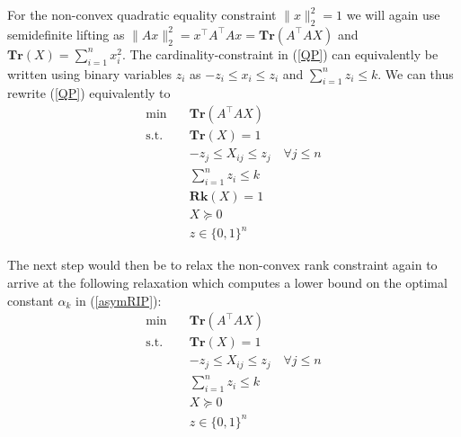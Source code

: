 \documentclass[a4paper,11pt,1p]{elsarticle}
\newcommand{\Norm}[2]{\lVert{#1}\rVert_{#2}}
\newcommand{\T}{^{\top}}
\newcommand{\Tr}{\textbf{Tr}}
\newcommand{\Rk}{\textbf{Rk}}
\begin{document}
For the non-convex quadratic equality constraint $\Norm{x}{2}^2 = 1$ we will
again use semidefinite lifting as $\Norm{Ax}{2}^2 = x\T A\T Ax =
\Tr(A\T A X)$ and $\Tr(X) = \sum_{i=1}^n x_i^2$. 
The cardinality-constraint in (\ref{QP}) can equivalently be written using binary variables $z_i$ as $-z_i \leq x_i \leq z_i$ and $\sum_{i=1}^n z_i \leq k$. We can thus rewrite (\ref{QP}) equivalently to
% 
% 
\begin{align}\label{Rk1MISDP}
 \min \quad & \Tr(A\T A X) \nonumber \\
 \text{s.t.} \quad & \Tr(X) = 1 \nonumber \\
 & -z_j \leq X_{ij} \leq z_j \quad \forall j \leq n \nonumber \\
 & \sum_{i=1}^n z_i \leq k \tag{Rk1MISDP} \\
 & \Rk(X) = 1 \nonumber \\
 & X \succeq 0  \nonumber \\
 & z \in \{0,1\}^n \nonumber
\end{align}

The next step would then be to relax the non-convex rank constraint again to arrive at the following relaxation which computes a lower bound on the optimal constant $\alpha_k$ in (\ref{asymRIP}):
\begin{align}\label{MISDP}
 \min \quad & \Tr(A\T A X) \nonumber \\
 \text{s.t.} \quad & \Tr(X) = 1 \nonumber \\
 & -z_j \leq X_{ij} \leq z_j \quad \forall j \leq n \nonumber \\
 & \sum_{i=1}^n z_i \leq k \tag{MISDP} \\
 & X \succeq 0  \nonumber \\
 & z \in \{0,1\}^n \nonumber
\end{align}
\end{document}
